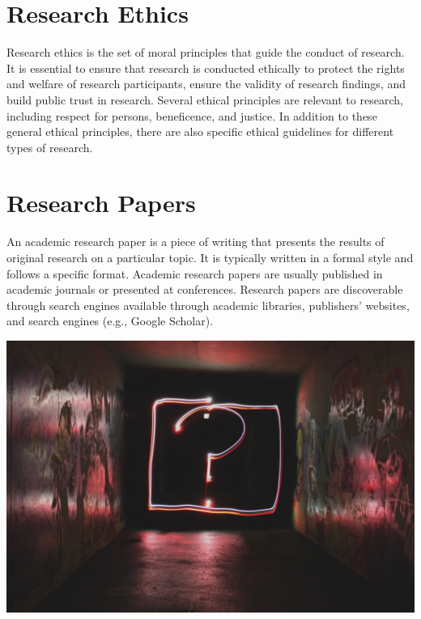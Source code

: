 \documentclass[
  b5paper]{book}
\begin{document}
\hypertarget{research-ethics}{%
\section*{Research Ethics}\label{research-ethics}}

Research ethics is the set of moral principles that guide the conduct of research. It is essential to ensure that research is conducted ethically to protect the rights and welfare of research participants, ensure the validity of research findings, and build public trust in research. Several ethical principles are relevant to research, including respect for persons, beneficence, and justice. In addition to these general ethical principles, there are also specific ethical guidelines for different types of research.

\hypertarget{research-papers}{%
\section*{Research Papers}\label{research-papers}}

An academic research paper is a piece of writing that presents the results of original research on a particular topic. It is typically written in a formal style and follows a specific format. Academic research papers are usually published in academic journals or presented at conferences. Research papers are discoverable through search engines available through academic libraries, publishers' websites, and search engines (e.g., Google Scholar).

\includegraphics[width=1\textwidth,height=\textheight]{images/question_mark.jpg}
\end{document}
